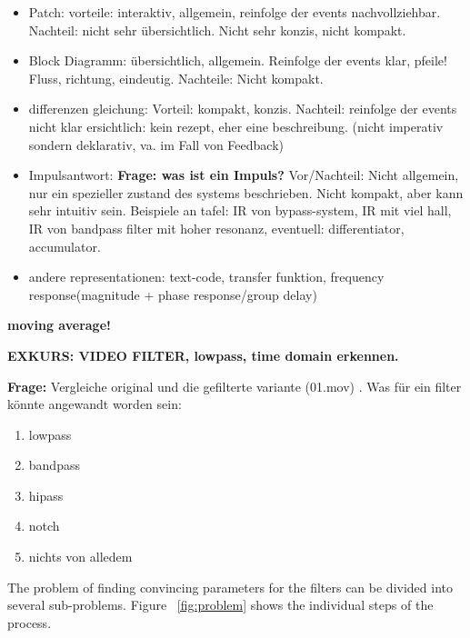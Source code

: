 \begin{itemize}
	\item Patch: vorteile: interaktiv, allgemein, reinfolge der events nachvollziehbar. Nachteil: nicht sehr übersichtlich. Nicht sehr konzis, nicht kompakt.
	\item Block Diagramm: übersichtlich, allgemein. Reinfolge der events klar, pfeile! Fluss, richtung, eindeutig. Nachteile: Nicht kompakt.
	\item differenzen gleichung: Vorteil: kompakt, konzis. Nachteil: reinfolge der events nicht klar ersichtlich: kein rezept, eher eine beschreibung. (nicht imperativ sondern deklarativ, va. im Fall von Feedback)
	\item Impulsantwort: \textbf{Frage: was ist ein Impuls?}  Vor/Nachteil: Nicht allgemein, nur ein spezieller zustand des systems beschrieben. Nicht kompakt, aber kann sehr intuitiv sein. Beispiele an tafel: IR von bypass-system, IR mit viel hall, IR von bandpass filter mit hoher resonanz, eventuell: differentiator, accumulator.
	\item andere representationen: text-code, transfer funktion, frequency response(magnitude + phase response/group delay)
\end{itemize}


\textbf{moving average!}



\textbf{EXKURS: VIDEO FILTER, lowpass, time domain erkennen.}


\newpage
\textbf{Frage:} Vergleiche original und die gefilterte variante (01.mov) . Was für ein filter könnte angewandt worden sein:
\begin{enumerate}
 	\item lowpass
 	\item bandpass
 	\item hipass
 	\item notch
 	\item nichts von alledem
 \end{enumerate} 

\newpage



The problem of finding convincing parameters for the filters can be divided into several sub-problems. Figure ~\ref{fig:problem} shows the individual steps of the process.



